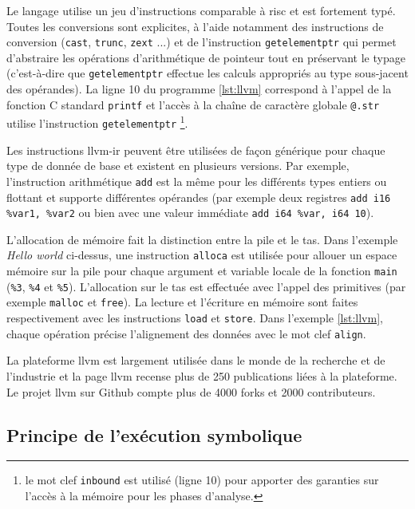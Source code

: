             Le langage utilise un jeu d'instructions comparable à \gls{risc} et est fortement typé. Toutes les conversions sont explicites, à l'aide notamment des instructions de conversion (\texttt{cast}, \texttt{trunc}, \texttt{zext} ...) et de l'instruction \texttt{getelementptr} qui permet d'abstraire les opérations d'arithmétique de pointeur tout en préservant le typage (c'est-à-dire que \texttt{getelementptr} effectue les calculs appropriés au type sous-jacent des opérandes). La ligne 10 du programme \ref{lst:llvm}  correspond à l'appel de la fonction C standard \texttt{printf} et l'accès à la chaîne de caractère globale \texttt{@.str} utilise l'instruction \texttt{getelementptr} \footnote{le mot clef \texttt{inbound} est utilisé (ligne 10) pour apporter des garanties sur l'accès à la mémoire pour les phases d'analyse.}.
            
            Les instructions \gls{llvm-ir} peuvent être utilisées de façon générique pour chaque type de donnée de base et existent en plusieurs versions. Par exemple, l'instruction arithmétique \texttt{add} est la même pour les différents types entiers ou flottant et supporte différentes opérandes (par exemple deux registres \texttt{add i16 \%var1, \%var2} ou bien avec une valeur immédiate \texttt{add i64 \%var, i64 10}).            
            
            L'allocation de mémoire fait la distinction entre la pile et le tas. Dans l'exemple \textit{Hello world} ci-dessus, une instruction \texttt{alloca} est utilisée pour allouer un espace mémoire sur la pile pour chaque argument et variable locale de la fonction \texttt{main} (\texttt{\%3}, \texttt{\%4} et \texttt{\%5}). L'allocation sur le tas est effectuée avec l'appel des primitives (par exemple \texttt{malloc} et \texttt{free}). La lecture et l'écriture en mémoire sont faites respectivement avec les instructions \texttt{load} et \texttt{store}. Dans l'exemple \ref{lst:llvm}, chaque opération précise l'alignement des données avec le mot clef \texttt{align}.
            
            La plateforme \gls{llvm} est largement utilisée dans le monde de la recherche et de l'industrie et la page \gls{llvm} \cite{llvm/pub} recense plus de 250 publications liées à la plateforme. Le projet \gls{llvm} sur Github \cite{llvm/github} compte plus de 4000 forks et 2000 contributeurs.  
     
        \subsection{Principe de l'exécution symbolique}
        \label{sec:se}
            
